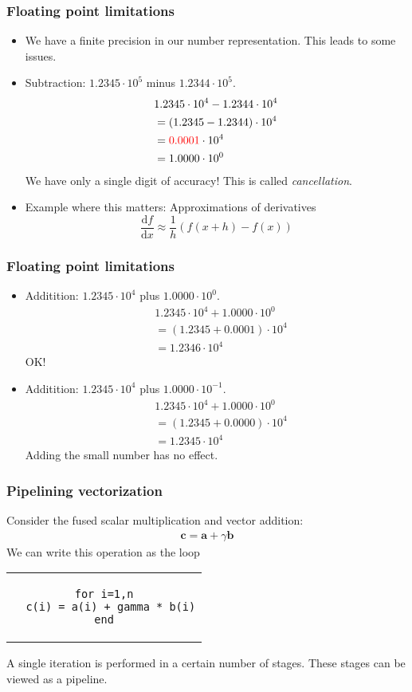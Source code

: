 \begin{frame}
  \frametitle{Floating point limitations}
  \begin{itemize}
  \item We have a finite precision in our number representation. This leads to
    some issues.
  \item Subtraction: $1.2345\cdot 10^5$ minus $1.2344\cdot 10^5$.
    \begin{align*}
      & 1.2345 \cdot 10^4 - 1.2344 \cdot 10^4 \\
      &= (1.2345 - 1.2344) \cdot 10^4 \\
      &= \textcolor{red}{0.0001} \cdot 10^4 \\
      &= 1.0000 \cdot 10^0
    \end{align*}
    We have only a single digit of accuracy! This is called \emph{cancellation}.
  \item Example where this matters: Approximations of derivatives
    \[
      \frac{\text{d}f}{\text{d}x} \approx \frac{1}{h}\left( f(x+h) - f(x) \right)
    \]
  \end{itemize}
\end{frame}

\begin{frame}
  \frametitle{Floating point limitations}
  \begin{itemize}
  \item Additition: $1.2345\cdot 10^4$ plus $1.0000\cdot 10^0$.
    \begin{align*}
      & 1.2345 \cdot 10^4 + 1.0000 \cdot 10^0 \\
      &= (1.2345 + 0.0001) \cdot 10^4 \\
      &= 1.2346 \cdot 10^4
    \end{align*}
    OK!
  \item Additition: $1.2345\cdot 10^4$ plus $1.0000\cdot 10^{-1}$.
    \begin{align*}
      & 1.2345 \cdot 10^4 + 1.0000 \cdot 10^0 \\
      &= (1.2345 + 0.0000) \cdot 10^4 \\
      &= 1.2345 \cdot 10^4
    \end{align*}
    Adding the small number has no effect.
  \end{itemize}
\end{frame}

\begin{frame}[fragile]
  \frametitle{Pipelining vectorization}
  Consider the fused scalar multiplication and vector addition:
  \begin{align*}
    \bm c = \bm a + \gamma \bm b
  \end{align*}
  We can write this operation as the loop
  \begin{center}
    \begin{tabular}{c}
\begin{lstlisting}[style=fortran]
for i=1,n
  c(i) = a(i) + gamma * b(i)
end
\end{lstlisting}
    \end{tabular}
  \end{center}
  A single iteration is performed in a certain number of stages. These stages
  can be viewed as a pipeline.
\end{frame}

